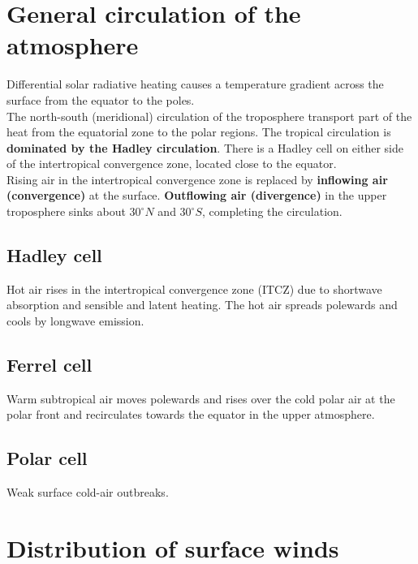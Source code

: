 \documentclass[11pt]{article}
\begin{document}
\section{General circulation of the atmosphere}
\label{sec:orgf8b17ef}
Differential solar radiative heating causes a temperature gradient across the surface from the equator to the poles.
\\[0pt]

The north-south (meridional) circulation of the troposphere transport part of the heat from the equatorial zone to the polar regions. The tropical circulation is \textbf{dominated by the Hadley circulation}. There is a Hadley cell on either side of the intertropical convergence zone, located close to the equator.
\\[0pt]

Rising air in the intertropical convergence zone is replaced by \textbf{inflowing air (convergence)} at the surface. \textbf{Outflowing air (divergence)} in the upper troposphere sinks about \(30^{\circ} N\) and \(30^{\circ} S\), completing the circulation.

\subsection{Hadley cell}
\label{sec:org5c16e32}
Hot air rises in the intertropical convergence zone (ITCZ) due to shortwave absorption and sensible and latent heating. The hot air spreads polewards and cools by longwave emission.

\subsection{Ferrel cell}
\label{sec:org97fe257}
Warm subtropical air moves polewards and rises over the cold polar air at the polar front and recirculates towards the equator in the upper atmosphere.

\subsection{Polar cell}
\label{sec:orgd0efb0d}
Weak surface cold-air outbreaks.


\section{Distribution of surface winds}
\label{sec:org0ac6138}
\end{document}
